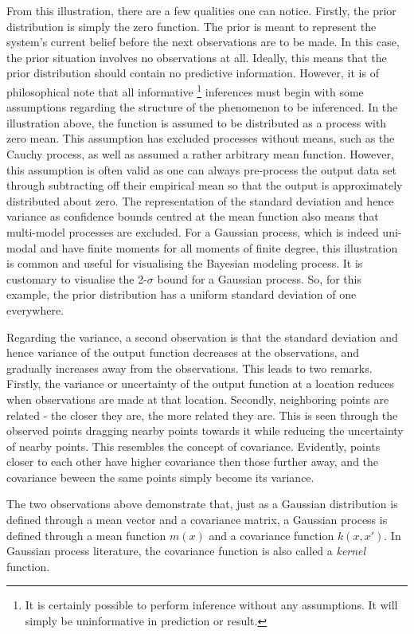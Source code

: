 			From this illustration, there are a few qualities one can notice. Firstly, the prior distribution is simply the zero function. The prior is meant to represent the system's current belief before the next observations are to be made. In this case, the prior situation involves no observations at all. Ideally, this means that the prior distribution should contain no predictive information. However, it is of philosophical note that all informative \footnote{It is certainly possible to perform inference without any assumptions. It will simply be uninformative in prediction or result.} inferences must begin with some assumptions regarding the structure of the phenomenon to be inferenced. In the illustration above, the function is assumed to be distributed as a process with zero mean. This assumption has excluded processes without means, such as the Cauchy process, as well as assumed a rather arbitrary mean function. However, this assumption is often valid as one can always pre-process the output data set through subtracting off their empirical mean so that the output is approximately distributed about zero. The representation of the standard deviation and hence variance as confidence bounds centred at the mean function also means that multi-model processes are excluded. For a Gaussian process, which is indeed uni-modal and have finite moments for all moments of finite degree, this illustration is common and useful for visualising the Bayesian modeling process. It is customary to visualise the 2-$\sigma$ bound for a Gaussian process. So, for this example, the prior distribution has a uniform standard deviation of one everywhere.
			
			Regarding the variance, a second observation is that the standard deviation and hence variance of the output function decreases at the observations, and gradually increases away from the observations. This leads to two remarks. Firstly, the variance or uncertainty of the output function at a location reduces when observations are made at that location. Secondly, neighboring points are related - the closer they are, the more related they are. This is seen through the observed points dragging nearby points towards it while reducing the uncertainty of nearby points. This resembles the concept of covariance. Evidently, points closer to each other have higher covariance then those further away, and the covariance beween the same points simply become its variance.
			
			The two observations above demonstrate that, just as a Gaussian distribution is defined through a mean vector and a covariance matrix, a Gaussian process is defined through a mean function $m(x)$ and a covariance function $k(x, x')$. In Gaussian process literature, the covariance function is also called a \textit{kernel} function.
			
